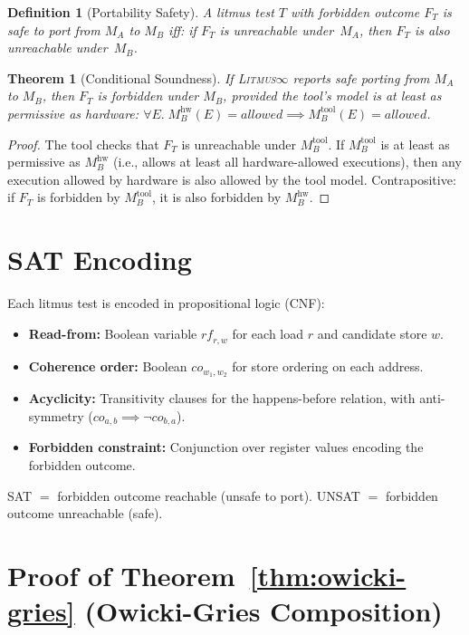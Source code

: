 \documentclass[11pt]{article}
\newcommand{\litmus}{\textsc{Litmus$\infty$}}
\newtheorem{theorem}{Theorem}
\newtheorem{definition}{Definition}
\begin{document}
\begin{definition}[Portability Safety]
A litmus test $T$ with forbidden outcome $F_T$ is \emph{safe}
to port from $M_A$ to $M_B$ iff: if $F_T$ is unreachable
under~$M_A$, then $F_T$ is also unreachable under~$M_B$.
\end{definition}

\begin{theorem}[Conditional Soundness]
\label{thm:soundness}
If \litmus{} reports safe porting from $M_A$ to $M_B$, then
$F_T$ is forbidden under $M_B$, provided the tool's model
is at least as permissive as hardware:
$\forall E.\; M_B^{\mathrm{hw}}(E) = \mathit{allowed} \implies
M_B^{\mathrm{tool}}(E) = \mathit{allowed}$.
\end{theorem}

\begin{proof}
The tool checks that $F_T$ is unreachable under $M_B^{\mathrm{tool}}$.
If $M_B^{\mathrm{tool}}$ is at least as permissive as $M_B^{\mathrm{hw}}$
(i.e., allows at least all hardware-allowed executions), then
any execution allowed by hardware is also allowed by the tool model.
Contrapositive: if $F_T$ is forbidden by $M_B^{\mathrm{tool}}$,
it is also forbidden by $M_B^{\mathrm{hw}}$.
\end{proof}

\section{SAT Encoding}
\label{app:smt}

Each litmus test is encoded in propositional logic (CNF):
\begin{itemize}[nosep]
\item \textbf{Read-from:} Boolean variable $\mathit{rf}_{r,w}$ for
  each load $r$ and candidate store $w$.
\item \textbf{Coherence order:} Boolean $\mathit{co}_{w_1,w_2}$ for
  store ordering on each address.
\item \textbf{Acyclicity:} Transitivity clauses for the happens-before
  relation, with anti-symmetry ($\mathit{co}_{a,b} \implies
  \neg \mathit{co}_{b,a}$).
\item \textbf{Forbidden constraint:} Conjunction over register values
  encoding the forbidden outcome.
\end{itemize}

SAT $=$ forbidden outcome reachable (unsafe to port).
UNSAT $=$ forbidden outcome unreachable (safe).

\section{Proof of Theorem~\ref{thm:owicki-gries} (Owicki-Gries Composition)}
\label{app:og-proof}
\end{document}
